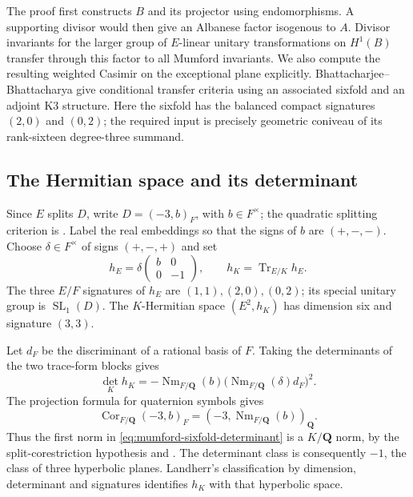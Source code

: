 The proof first constructs $B$ and its projector using endomorphisms.
A supporting divisor would then give an Albanese factor isogenous to
$A$.  Divisor invariants for the larger group of $E$-linear unitary
transformations on $H^1(B)$ transfer through this factor to all
Mumford invariants.  We also compute the resulting weighted Casimir
on the exceptional plane explicitly.
Bhattacharjee--Bhattacharya \cite[Theorems~37--38]{BBK3Sixfolds}
give conditional transfer criteria using an associated sixfold and
an adjoint K3 structure.  Here the sixfold has the balanced compact
signatures $(2,0)$ and $(0,2)$; the required input is precisely
geometric coniveau of its rank-sixteen degree-three summand.

\subsection{The Hermitian space and its determinant}

Since $E$ splits $D$, write $D=(-3,b)_F$, with $b\in F^\times$;
the quadratic splitting criterion is
\cite[Lemma~5.4.7, pp.~73--74]{VoightQuaternion}.
Label the real embeddings so that the signs of $b$ are $(+,-,-)$.
Choose $\delta\in F^\times$ of signs $(+,-,+)$ and set
\[
 h_E=\delta\begin{pmatrix}b&0\\0&-1\end{pmatrix},
 \qquad h_K=\operatorname{Tr}_{E/K}h_E.
\]
The three $E/F$ signatures of $h_E$ are $(1,1),(2,0),(0,2)$;
its special unitary group is $\operatorname{SL}_1(D)$.
The $K$-Hermitian space $(E^2,h_K)$ has dimension six and signature
$(3,3)$.

Let $d_F$ be the discriminant of a rational basis of $F$.  Taking the
determinants of the two trace-form blocks gives
\begin{equation}
 \det_K h_K
 =-\operatorname{Nm}_{F/\mathbf Q}(b)
       \bigl(\operatorname{Nm}_{F/\mathbf Q}(\delta)d_F\bigr)^2.
 \label{eq:mumford-sixfold-determinant}
\end{equation}
The projection formula for quaternion symbols
\cite[II, Proposition~1.39(d), p.~74]{MilneCFT} gives
\[
 \operatorname{Cor}_{F/\mathbf Q}(-3,b)_F
   =(-3,\operatorname{Nm}_{F/\mathbf Q}(b))_{\mathbf Q}.
\]
Thus the first norm in \eqref{eq:mumford-sixfold-determinant} is a
$K/\mathbf Q$ norm, by the split-corestriction hypothesis and
\cite[Main Theorem~5.4.4(vi), pp.~72--73]{VoightQuaternion}.  The
determinant class is consequently $-1$, the class of three hyperbolic
planes.  Landherr's classification by dimension, determinant and
signatures \cite[pp.~246--247]{Landherr} identifies $h_K$ with that
hyperbolic space.

